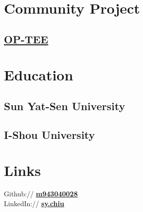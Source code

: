 \documentclass[a4paper]{deedy-resume} %
\begin{document}
\begin{minipage}[t]{0.33\textwidth}
\sectionspace %

\section{Community Project} 

\subsection{\href{https://github.com/OP-TEE}{\bf OP-TEE}}

\sectionspace %

\section{Education}

\subsection{Sun Yat-Sen University}



\subsection{I-Shou University}


\sectionspace %

\section{Links} 

Github:// \href{https://github.com/m943040028}{\bf m943040028} \\
LinkedIn:// \href{http://lnkd.in/Exzyne}{\bf sy.chiu} \\

\sectionspace %


\end{minipage} %
\hfill
%
\end{document}
